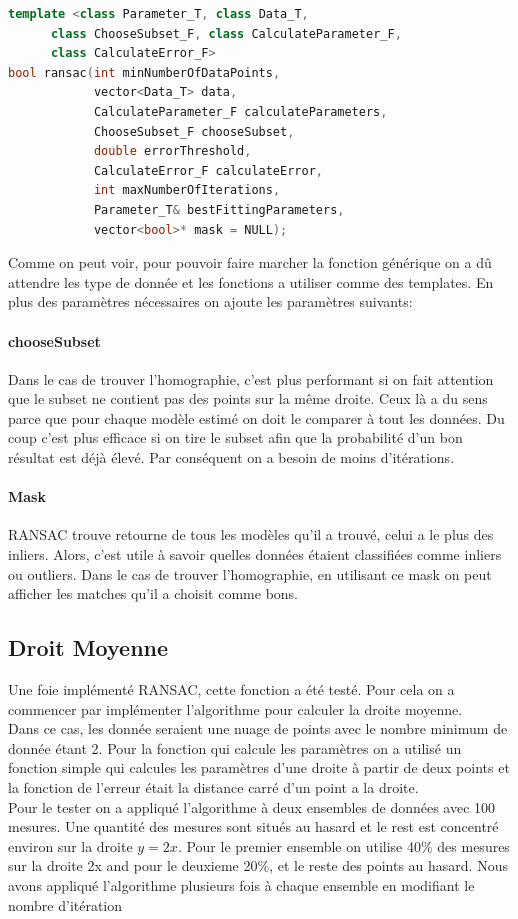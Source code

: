 \documentclass[11pt]{article}
\begin{document}
\begin{lstlisting}[language=c++]
template <class Parameter_T, class Data_T, 
	  class ChooseSubset_F, class CalculateParameter_F,
	  class CalculateError_F>
bool ransac(int minNumberOfDataPoints,
            vector<Data_T> data,
            CalculateParameter_F calculateParameters, 
            ChooseSubset_F chooseSubset,
            double errorThreshold, 
            CalculateError_F calculateError, 
            int maxNumberOfIterations,
            Parameter_T& bestFittingParameters,
            vector<bool>* mask = NULL);
\end{lstlisting}

Comme on peut voir, pour pouvoir faire marcher la fonction générique on a dû attendre les type de donnée et les fonctions a utiliser comme des templates. En plus des paramètres nécessaires on ajoute les paramètres suivants:

\paragraph{chooseSubset}
Dans le cas de trouver l’homographie, c’est plus performant si on fait attention que le subset ne contient pas des points sur la même droite. Ceux là a du sens parce que pour chaque modèle estimé on doit le comparer à tout les données. Du coup c'est plus efficace si on tire le subset afin que la probabilité d'un bon résultat est déjà élevé. Par conséquent on a besoin de moins d'itérations.

\paragraph{Mask}
RANSAC trouve retourne de tous les modèles qu’il a trouvé, celui a le plus des inliers. Alors, c'est utile à savoir quelles données étaient classifiées comme inliers ou outliers. Dans le cas de trouver l'homographie, en utilisant ce mask on peut afficher les matches qu’il a choisit comme bons.


\subsection{Droit Moyenne}

Une foie implémenté RANSAC, cette fonction a été testé. Pour cela on a commencer par implémenter l’algorithme pour calculer la droite moyenne. \\
Dans ce cas, les donnée seraient une nuage de points avec le nombre minimum de donnée étant 2. Pour la fonction qui calcule les paramètres on a utilisé un fonction simple qui calcules les paramètres d’une droite à partir de deux points et la fonction de l’erreur était la distance carré d’un point a la droite. \\
Pour le tester on a appliqué l’algorithme à deux ensembles de données avec 100 mesures. Une quantité des mesures sont situés au hasard et le rest est concentré environ sur la droite $y = 2x$. Pour le premier ensemble on utilise 40\% des mesures sur la droite 2x and pour le deuxieme 20\%, et le reste des points au hasard. Nous avons appliqué l'algorithme plusieurs fois à chaque ensemble en modifiant le nombre d’itération
\end{document}
